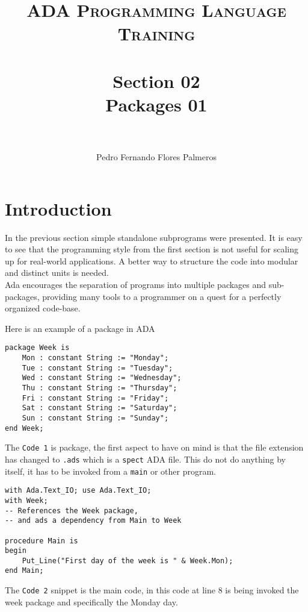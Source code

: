 \documentclass[paper=a4, fontsize=11pt]{scrartcl} %
\title{	
\normalfont \normalsize 
\textsc{ADA Programming Language Training} \\ [25pt] %
\horrule{0.5pt} \\[0.4cm] %
\huge Section 02 \\ Packages 01\\ %
\horrule{2pt} \\[0.5cm] %
}
\author{Pedro Fernando Flores Palmeros} %
\date{} %
\numberwithin{equation}{section} %
\numberwithin{figure}{section} %
\numberwithin{table}{section} %
\begin{document}
\maketitle %
 

\section{Introduction}
In the previous section simple standalone subprograms were presented. It is easy to see that the programming style from the first section is not useful for scaling up for real-world applications. A better way to structure the code into modular and distinct units is needed.\\

Ada encourages the separation of programs into multiple packages and sub-packages, providing many tools to a  programmer on a quest for a perfectly organized code-base. 

Here is an example of a package in ADA

\begin{lstlisting}[caption = {week.ads}]
package Week is
	Mon : constant String := "Monday";
	Tue : constant String := "Tuesday";
	Wed : constant String := "Wednesday";
	Thu : constant String := "Thursday";
	Fri : constant String := "Friday";
	Sat : constant String := "Saturday";
	Sun : constant String := "Sunday";
end Week;
\end{lstlisting}

The \verb|Code 1| is package, the first aspect to have on mind is that the file extension has changed to \verb|.ads|  which is a \verb|spect| ADA file. This do not do anything by itself, it has to be invoked from a \verb|main| or other program. 

\begin{lstlisting}[caption = {main.adb}]
with Ada.Text_IO; use Ada.Text_IO;
with Week;
-- References the Week package,
-- and ads a dependency from Main to Week

procedure Main is 
begin  
	Put_Line("First day of the week is " & Week.Mon);
end Main;
\end{lstlisting}

The \verb|Code 2| snippet is the main code, in this code at line 8 is being invoked the week package and specifically the Monday day. \\
\end{document}
